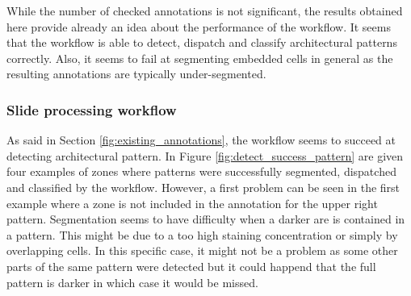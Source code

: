 While the number of checked annotations is not significant, the results obtained here provide already an idea about the performance of the workflow. It seems that the workflow is able to detect, dispatch and classify architectural patterns correctly. Also, it seems to fail at segmenting embedded cells in general as the resulting annotations are typically under-segmented. 

\subsubsection{Slide processing workflow}
\label{ssec:detect_slide_processing}
As said in Section \ref{fig:existing_annotations}, the workflow seems to succeed at detecting architectural pattern. In Figure \ref{fig:detect_success_pattern} are given four examples of zones where patterns were successfully segmented, dispatched and classified by the workflow. However, a first problem can be seen in the first example where a zone is not included in the annotation for the upper right pattern. Segmentation seems to have difficulty when a darker are is contained in a pattern. This might be due to a too high staining concentration or simply by overlapping cells. In this specific case, it might not be a problem as some other parts of the same pattern were detected but it could happend that the full pattern is darker in which case it would be missed. 

